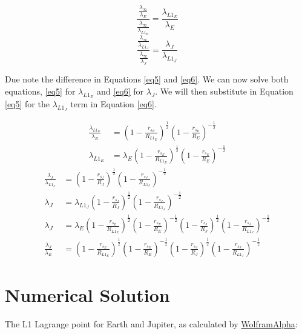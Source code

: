 \documentclass[]{report}
\begin{document}
      \begin{equation} \label{eq5}
        \frac{\frac{\lambda_\infty}{\lambda_E}}{\frac{\lambda_\infty}{\lambda_{L1_E}}} = \frac{\lambda_{L1_E}}{\lambda_E}
        \end{equation}
      \begin{equation} \label{eq6}
        \frac{\frac{\lambda_\infty}{\lambda_{L1_J}}}{\frac{\lambda_\infty}{\lambda_J}} = \frac{\lambda_J}{\lambda_{L1_J}}
        \end{equation}

      Due note the difference in Equations \ref{eq5} and \ref{eq6}. We can now solve both equations, \ref{eq5} for $\lambda_{L1_E}$ and \ref{eq6} for $\lambda_J$. We will then substitute in Equation \ref{eq5} for the $\lambda_{L1_J}$ term in Equation \ref{eq6}.

      \begin{align*}
        \frac{\lambda_{L1_E}}{\lambda_E} &= \left(1 - \frac{r_{s_E}}{R_{L1_E}} \right)^{\frac{1}{2}} \left(1 - \frac{r_{s_E}}{R_E} \right)^{-\frac{1}{2}}\\
        \lambda_{L1_E} &= \lambda_E\left(1 - \frac{r_{s_E}}{R_{L1_E}} \right)^{\frac{1}{2}} \left(1 - \frac{r_{s_E}}{R_E} \right)^{-\frac{1}{2}}
        \end{align*}
      \begin{equation} \label{eq7}
        \begin{split}
          \frac{\lambda_J}{\lambda_{L1_J}} &= \left(1 - \frac{r_{s_J}}{R_{J}} \right)^{\frac{1}{2}} \left(1 - \frac{r_{s_J}}{R_{L1_J}} \right)^{-\frac{1}{2}}\\
          \lambda_J &= \lambda_{L1_J}\left(1 - \frac{r_{s_J}}{R_{J}} \right)^{\frac{1}{2}} \left(1 - \frac{r_{s_J}}{R_{L1_J}} \right)^{-\frac{1}{2}}\\
          \lambda_J &= \lambda_E\left(1 - \frac{r_{s_E}}{R_{L1_E}} \right)^{\frac{1}{2}} \left(1 - \frac{r_{s_E}}{R_E} \right)^{-\frac{1}{2}}\left(1 - \frac{r_{s_J}}{R_{J}} \right)^{\frac{1}{2}} \left(1 - \frac{r_{s_J}}{R_{L1_J}} \right)^{-\frac{1}{2}}\\
          \frac{\lambda_J}{\lambda_E} &= \left(1 - \frac{r_{s_E}}{R_{L1_E}} \right)^{\frac{1}{2}} \left(1 - \frac{r_{s_E}}{R_E} \right)^{-\frac{1}{2}}\left(1 - \frac{r_{s_J}}{R_{J}} \right)^{\frac{1}{2}} \left(1 - \frac{r_{s_J}}{R_{L1_J}} \right)^{-\frac{1}{2}}
        \end{split}
        \end{equation}

    \section{Numerical Solution}
      The L1 Lagrange point for Earth and Jupiter, as calculated by \href{https://www.wolframalpha.com/input/?i=lagrange+point+earth+and+jupiter}{WolframAlpha}:
\end{document}
